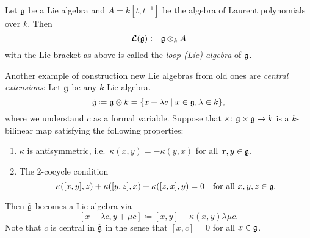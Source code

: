 \begin{defi}
 Let $\mathfrak{g}$ be a Lie algebra and $A = k[t,t^{-1}]$ be the algebra of Laurent polynomials over $k$. Then
 \[
  \mathcal{L}(\mathfrak{g}) \coloneqq \mathfrak{g} \otimes_k A
 \]
 with the Lie bracket as above is called the \emph{loop (Lie) algebra} of $\mathfrak{g}$.
\end{defi}


Another example of construction new Lie algebras from old ones are \emph{central extensions}: Let $\mathfrak{g}$ be any $k$-Lie algebra.
\[
 \tilde{\mathfrak{g}}
 \coloneqq \mathfrak{g} \otimes k
 = \{x + \lambda c \mid x \in \mathfrak{g}, \lambda \in k\},
\]
where we understand $c$ as a formal variable. Suppose that $\kappa \colon \mathfrak{g} \times \mathfrak{g} \to k$ is a $k$-bilinear map satisfying the following properties:
\begin{enumerate}
 \item
  $\kappa$ is antisymmetric, i.e.\ $\kappa(x,y) = -\kappa(y,x)$ for all $x,y \in \mathfrak{g}$.
 \item
  The $2$-cocycle condition
  \[
   \kappa([x,y],z) + \kappa([y,z],x) + \kappa([z,x],y) = 0
   \quad
   \text{for all $x,y,z \in \mathfrak{g}$}.
  \]
\end{enumerate}
Then $\tilde{\mathfrak{g}}$ becomes a Lie algebra via
\[
 [x + \lambda c, y + \mu c] \coloneqq [x,y] + \kappa(x,y) \lambda \mu c.
\]
Note that $c$ is central in $\tilde{\mathfrak{g}}$ in the sense that $[x,c] = 0$ for all $x \in \mathfrak{g}$.


